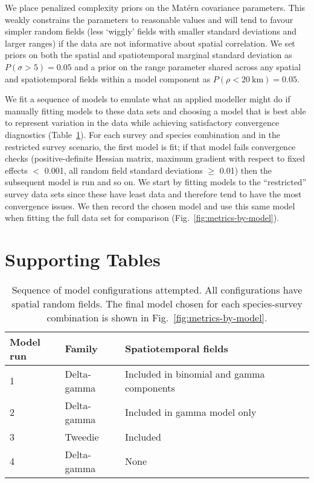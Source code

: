 \documentclass[12pt]{article}
\begin{document}
We place penalized complexity priors \citep{fuglstad2019} on the Mat\'ern covariance parameters. This weakly constrains the parameters to reasonable values and will tend to favour simpler random fields (less `wiggly' fields with smaller standard deviations and larger ranges) if the data are not informative about spatial correlation. We set priors on both the spatial and spatiotemporal marginal standard deviation as $P(\sigma > 5) = 0.05$ and a prior on the range parameter shared across any spatial and spatiotemporal fields within a model component as $P(\rho < 20\ \mathrm{km}) = 0.05$.

We fit a sequence of models to emulate what an applied modeller might do if manually fitting models to these data sets and choosing a model that is best able to represent variation in the data while achieving satisfactory convergence diagnostics (Table~\ref{tab:model-configs}). For each survey and species combination and in the restricted survey scenario, the first model is fit; if that model fails convergence checks (positive-definite Hessian matrix, maximum gradient with respect to fixed effects $<$ 0.001, all random field standard deviations $\ge$ 0.01) then the subsequent model is run and so on. We start by fitting models to the ``restricted'' survey data sets since these have least data and therefore tend to have the most convergence issues. We then record the chosen model and use this same model when fitting the full data set for comparison (Fig.~\ref{fig:metrics-by-model}).

\clearpage

\section*{Supporting Tables}



\clearpage

\begin{table}[htpb]
\caption{Sequence of model configurations attempted. All configurations have
spatial random fields. The final model chosen for each species-survey combination is shown in Fig.~\ref{fig:metrics-by-model}.}
\centering
\begin{tabular}{lllll}
\toprule
Model run & Family & Spatiotemporal fields  \\
\midrule
1 & Delta-gamma & Included in binomial and gamma components  \\
2 & Delta-gamma & Included in gamma model only \\
3 & Tweedie & Included  \\
4 & Delta-gamma & None \\
\bottomrule
\end{tabular}
\label{tab:model-configs}
\end{table}
\end{document}
